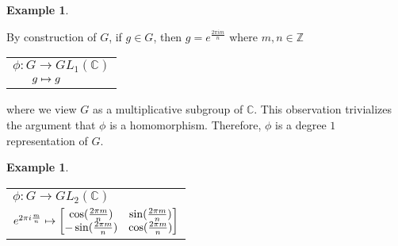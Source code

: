 \documentclass[10pt]{ucthesis}
\newtheorem{example}[definition]{Example}
\begin{document}
	

\begin{example}\end{example} 
By construction of $G$, if $g\in G$, then $g = e^{\frac{2\pi im }{n}}$ where $m,n\in \mathbb{Z}$	
	\renewcommand{\arraystretch}{0.7}
		\begin{center}	
		 \begin{tabular}{l}$\phi:G\rightarrow GL_1(\mathbb{C})$\\
		$\hspace{6mm}g\mapsto g$
		\end{tabular}
		\end{center}

\noindent where we view $G$ as a multiplicative subgroup of $\mathbb{C}$. This observation trivializes the argument that $\phi$ is a homomorphism. Therefore, $\phi$ is a degree $1$ representation of $G$.		


\begin{example}\end{example}
	\renewcommand{\arraystretch}{1}\begin{center}
		\begin{tabular}{l}$\phi:G\rightarrow GL_2(\mathbb{C})$\\
		$\hspace{0mm}e^{2\pi i\frac{m}{n}}\mapsto \begin{bmatrix}
							\cos(\frac{2\pi m}{n}) & \sin(\frac{2\pi m}{n}) \\
							-\sin(\frac{2\pi m}{n}) & \cos(\frac{2\pi m}{n})
						      \end{bmatrix}$
		\end{tabular}
\end{center}
\end{document}
